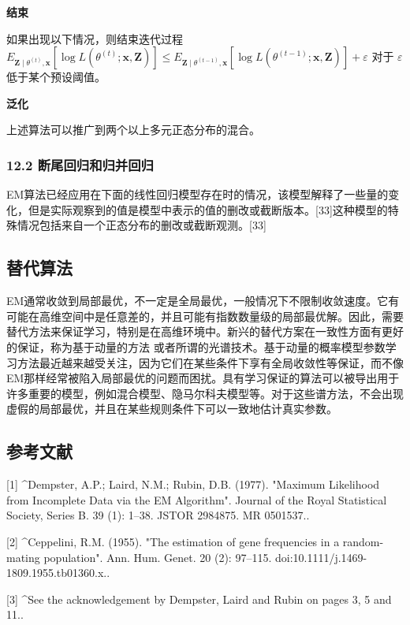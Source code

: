 \textbf{结束}

如果出现以下情况，则结束迭代过程 $E_{\mathbf{Z} \mid \theta^{(t)}, \mathbf{x}}[\log L(\theta^{(t)} ; \mathbf{x}, \mathbf{Z})] \leq E_{\mathbf{Z} \mid \theta^{(t-1)}, \mathbf{x}}[\log L(\theta^{(t-1)} ; \mathbf{x}, \mathbf{Z})] + \varepsilon$ 对于 $\varepsilon$ 低于某个预设阈值。

\textbf{泛化}

上述算法可以推广到两个以上多元正态分布的混合。

\subsubsection{12.2 断尾回归和归并回归}

EM算法已经应用在下面的线性回归模型存在时的情况，该模型解释了一些量的变化，但是实际观察到的值是模型中表示的值的删改或截断版本。[33]这种模型的特殊情况包括来自一个正态分布的删改或截断观测。[33]

\subsection{替代算法}

EM通常收敛到局部最优，不一定是全局最优，一般情况下不限制收敛速度。它有可能在高维空间中是任意差的，并且可能有指数数量级的局部最优解。因此，需要替代方法来保证学习，特别是在高维环境中。新兴的替代方案在一致性方面有更好的保证，称为基于动量的方法 或者所谓的光谱技术。基于动量的概率模型参数学习方法最近越来越受关注，因为它们在某些条件下享有全局收敛性等保证，而不像EM那样经常被陷入局部最优的问题而困扰。具有学习保证的算法可以被导出用于许多重要的模型，例如混合模型、隐马尔科夫模型等。对于这些谱方法，不会出现虚假的局部最优，并且在某些规则条件下可以一致地估计真实参数。

\subsection{参考文献}

[1]
^Dempster, A.P.; Laird, N.M.; Rubin, D.B. (1977). "Maximum Likelihood from Incomplete Data via the EM Algorithm". Journal of the Royal Statistical Society, Series B. 39 (1): 1–38. JSTOR 2984875. MR 0501537..

[2]
^Ceppelini, R.M. (1955). "The estimation of gene frequencies in a random-mating population". Ann. Hum. Genet. 20 (2): 97–115. doi:10.1111/j.1469-1809.1955.tb01360.x..

[3]
^See the acknowledgement by Dempster, Laird and Rubin on pages 3, 5 and 11..

